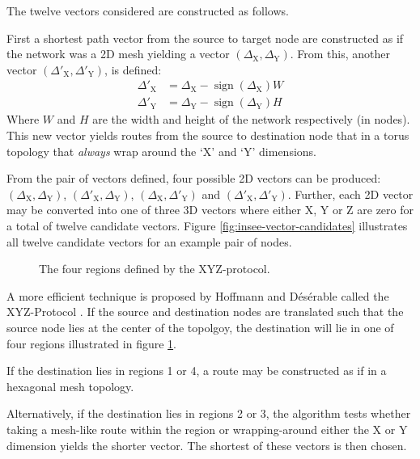 			The twelve vectors considered are constructed as follows.
			
			First a shortest path vector from the source to target node are
			constructed as if the network was a 2D mesh yielding a vector
			$(\Delta_\textrm{X},\Delta_\textrm{Y})$. From this, another vector
			$(\Delta'_\textrm{X},\Delta'_\textrm{Y})$, is defined:
			\begin{align}
				\Delta'_\textrm{X} &= \Delta_\textrm{X} - \operatorname{sign}(\Delta_\textrm{X})W
				\\
				\Delta'_\textrm{Y} &= \Delta_\textrm{Y} - \operatorname{sign}(\Delta_\textrm{Y})H
			\end{align}
			Where $W$ and $H$ are the width and height of the network respectively
			(in nodes). This new vector yields routes from the source to destination
			node that in a torus topology that \emph{always} wrap around the `X' and
			`Y' dimensions.
			
			From the pair of vectors defined, four possible 2D vectors can be
			produced: $(\Delta_\textrm{X},\Delta_\textrm{Y})$,
			$(\Delta'_\textrm{X},\Delta_\textrm{Y})$,
			$(\Delta_\textrm{X},\Delta'_\textrm{Y})$ and
			$(\Delta'_\textrm{X},\Delta'_\textrm{Y})$. Further, each 2D vector may be
			converted into one of three 3D vectors where either X, Y or Z are zero
			for a total of twelve candidate vectors.  Figure
			\ref{fig:insee-vector-candidates} illustrates all twelve candidate
			vectors for an example pair of nodes.
			
			\begin{figure}
				\center
				
				\caption{The four regions defined by the XYZ-protocol.}
				\label{fig:xyz-protocol-regions}
			\end{figure}
			
			A more efficient technique is proposed by Hoffmann and D\'es\'erable
			called the XYZ-Protocol \cite{hoffmann15,hoffmann11}. If the source and
			destination nodes are translated such that the source node lies at the
			center of the topolgoy, the destination will lie in one of four regions
			illustrated in figure \ref{fig:xyz-protocol-regions}.
			
			If the destination lies in regions 1 or 4, a route may be constructed as
			if in a hexagonal mesh topology.
			
			Alternatively, if the destination lies in regions 2 or 3, the algorithm
			tests whether taking a mesh-like route within the region or
			wrapping-around either the X or Y dimension yields the shorter vector.
			The shortest of these vectors is then chosen.
			
